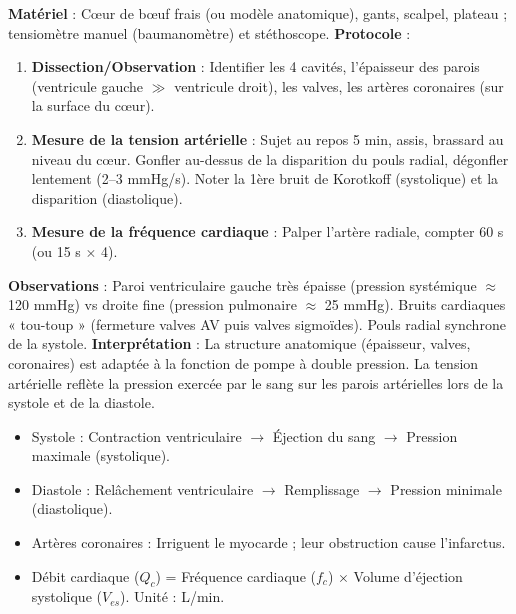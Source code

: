 \documentclass[11pt]{article}
\newcommand{\cle}[1]{{\popxbold\color{popdark}#1}}
\begin{document}
\begin{experience}
\textbf{Matériel} : Cœur de bœuf frais (ou modèle anatomique), gants, scalpel, plateau ; tensiomètre manuel (baumanomètre) et stéthoscope.
\textbf{Protocole} :
\begin{enumerate}
\item \textbf{Dissection/Observation} : Identifier les 4 cavités, l'épaisseur des parois (ventricule gauche $\gg$ ventricule droit), les valves, les artères coronaires (sur la surface du cœur).
\item \textbf{Mesure de la tension artérielle} : Sujet au repos 5 min, assis, brassard au niveau du cœur. Gonfler au-dessus de la disparition du pouls radial, dégonfler lentement (2--3 mmHg/s). Noter la 1ère bruit de Korotkoff (systolique) et la disparition (diastolique).
\item \textbf{Mesure de la fréquence cardiaque} : Palper l'artère radiale, compter 60 s (ou 15 s $\times$ 4).
\end{enumerate}
\textbf{Observations} : Paroi ventriculaire gauche très épaisse (pression systémique $\approx$ 120 mmHg) vs droite fine (pression pulmonaire $\approx$ 25 mmHg). Bruits cardiaques « tou-toup » (fermeture valves AV puis valves sigmoïdes). Pouls radial synchrone de la systole.
\textbf{Interprétation} : La structure anatomique (épaisseur, valves, coronaires) est adaptée à la fonction de pompe à double pression. La tension artérielle reflète la pression exercée par le sang sur les parois artérielles lors de la systole et de la diastole.
\end{experience}

\begin{aretenir}
\begin{itemize}
\item \cle{Systole} : Contraction ventriculaire $\rightarrow$ Éjection du sang $\rightarrow$ Pression maximale (systolique).
\item \cle{Diastole} : Relâchement ventriculaire $\rightarrow$ Remplissage $\rightarrow$ Pression minimale (diastolique).
\item \cle{Artères coronaires} : Irriguent le myocarde ; leur obstruction cause l'infarctus.
\item \cle{Débit cardiaque} ($Q_c$) = Fréquence cardiaque ($f_c$) $\times$ Volume d'éjection systolique ($V_{es}$). Unité : L/min.
\end{itemize}
\end{aretenir}
\end{document}
